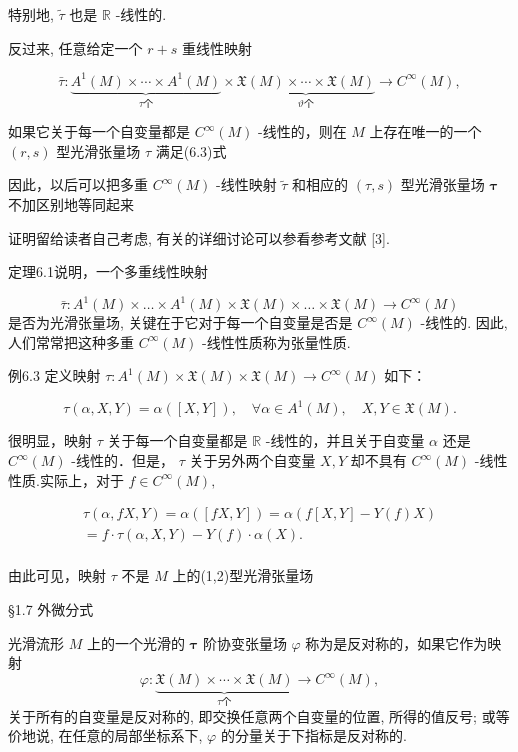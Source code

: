 特别地,  $\tilde{\tau}$  也是  $\mathbb{R}$ -线性的.

反过来, 任意给定一个  $r + s$  重线性映射

$$
\bar {\tau}: \underbrace {A ^ {1} (M) \times \cdots \times A ^ {1} (M)} _ {\tau \text {个}} \times \underbrace {\mathfrak {X} (M) \times \cdots \times \mathfrak {X} (M)} _ {\vartheta \text {个}} \to C ^ {\infty} (M),
$$

如果它关于每一个自变量都是  $C^\infty (M)$  -线性的，则在  $M$  上存在唯一的一个  $(r,s)$  型光滑张量场  $\tau$  满足(6.3)式

因此，以后可以把多重  $C^\infty (M)$  -线性映射  $\tilde{\tau}$  和相应的  $(\tau ,s)$  型光滑张量场  $\pmb{\tau}$  不加区别地等同起来

证明留给读者自己考虑, 有关的详细讨论可以参看参考文献 [3].

定理6.1说明，一个多重线性映射

$$
\bar {\tau}: A ^ {1} (M) \times \dots \times A ^ {1} (M) \times \mathfrak {X} (M) \times \dots \times \mathfrak {X} (M) \rightarrow C ^ {\infty} (M)
$$
是否为光滑张量场, 关键在于它对于每一个自变量是否是  $C^\infty(M)$ -线性的. 因此, 人们常常把这种多重  $C^\infty(M)$ -线性性质称为张量性质.

例6.3 定义映射  $\tau : A^1(M) \times \mathfrak{X}(M) \times \mathfrak{X}(M) \to C^\infty(M)$  如下：

$$
\tau (\alpha , X, Y) = \alpha ([ X, Y ]), \quad \forall \alpha \in A ^ {1} (M), \quad X, Y \in \mathfrak {X} (M).
$$

很明显，映射  $\tau$  关于每一个自变量都是  $\mathbb{R}$  -线性的，并且关于自变量  $\alpha$  还是  $C^\infty (M)$  -线性的．但是，  $\tau$  关于另外两个自变量  $X,Y$  却不具有 $C^\infty (M)$  -线性性质.实际上，对于  $f\in C^{\infty}(M),$

$$
\begin{array}{l} \tau (\alpha , f X, Y) = \alpha ([ f X, Y ]) = \alpha (f [ X, Y ] - Y (f) X) \\ = f \cdot \tau (\alpha , X, Y) - Y (f) \cdot \alpha (X). \\ \end{array}
$$

由此可见，映射  $\tau$  不是  $M$  上的(1,2)型光滑张量场

 §1.7 外微分式

光滑流形  $M$  上的一个光滑的  $\pmb{\tau}$  阶协变张量场  $\varphi$  称为是反对称的，如果它作为映射
$$
\varphi : \underbrace {\mathfrak {X} (M) \times \cdots \times \mathfrak {X} (M)} _ {\tau \text {个}} \to C ^ {\infty} (M),
$$
关于所有的自变量是反对称的, 即交换任意两个自变量的位置, 所得的值反号; 或等价地说, 在任意的局部坐标系下,  $\varphi$  的分量关于下指标是反对称的.

